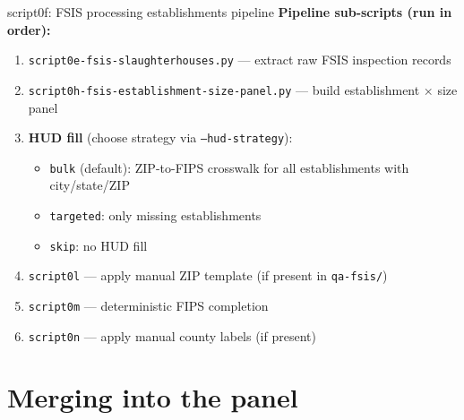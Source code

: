 \documentclass[aspectratio=169]{beamer}
\begin{document}
\begin{frame}{script0f: FSIS processing establishments pipeline}
\textbf{Pipeline sub-scripts (run in order):}
\begin{enumerate}\small
    \item \texttt{script0e-fsis-slaughterhouses.py} — extract raw FSIS inspection records
    \item \texttt{script0h-fsis-establishment-size-panel.py} — build establishment × size panel
    \item \textbf{HUD fill} (choose strategy via \texttt{--hud-strategy}):
    \begin{itemize}
        \item \texttt{bulk} (default): ZIP-to-FIPS crosswalk for all establishments with city/state/ZIP
        \item \texttt{targeted}: only missing establishments
        \item \texttt{skip}: no HUD fill
    \end{itemize}
    \item \texttt{script0l} — apply manual ZIP template (if present in \texttt{qa-fsis/})
    \item \texttt{script0m} — deterministic FIPS completion
    \item \texttt{script0n} — apply manual county labels (if present)
\end{enumerate}
\end{frame}


\section{Merging into the panel}
\end{document}
